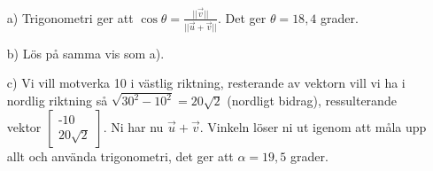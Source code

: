 \begin{enumerate}
	\item [a) ] Trigonometri ger att $\cos\theta = \frac{||\vec{v}||}{||\vec{u} + \vec{v}||} $. Det ger $\theta = 18,4$ grader. 
	\item [b) ] Lös på samma vis som a). 
	\item [c) ] Vi vill motverka 10 i västlig riktning, resterande av vektorn vill vi ha i nordlig riktning så $\sqrt{30^{2}-10^{2}} = 20\sqrt{2}$ (nordligt bidrag), ressulterande vektor $\begin{bmatrix} \text{-}10 \\ 20\sqrt{2}\end{bmatrix}$. Ni har nu $\vec{u} + \vec{v}$. Vinkeln löser ni ut igenom att måla upp allt och använda trigonometri, det ger att $\alpha = 19,5$ grader. 
\end{enumerate}